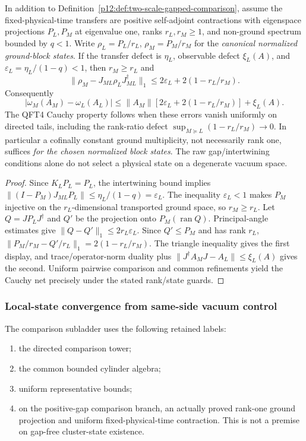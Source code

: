 \documentclass[12pt,a4paper]{article}
\begin{document}
\begin{theorem}
\label{p12:thm:two-scale-comparison-qft4}
In addition to Definition~\ref{p12:def:two-scale-gapped-comparison},
assume the fixed-physical-time transfers are positive self-adjoint
contractions with eigenspace projections $P_L,P_M$ at eigenvalue one,
ranks $r_L,r_M\ge1$, and non-ground spectrum bounded by $q<1$.
Write $\rho_L=P_L/r_L$, $\rho_M=P_M/r_M$ for the \emph{canonical
normalized ground-block states}. If the transfer defect is $\eta_L$,
observable defect $\xi_L(A)$, and
$\varepsilon_L=\eta_L/(1-q)<1$, then $r_M\ge r_L$ and
\[
 \boxed{\|\rho_M-J_{ML}\rho_LJ_{ML}^\dagger\|_1
 \le2\varepsilon_L+2(1-r_L/r_M)}.
\]
Consequently
\[
 |\omega_M(A_M)-\omega_L(A_L)|
 \le\|A_M\|[2\varepsilon_L+2(1-r_L/r_M)]+\xi_L(A).
\]
The QFT4 Cauchy property follows when these errors vanish uniformly
on directed tails, including the rank-ratio defect
$\sup_{M\succeq L}(1-r_L/r_M)\to0$.
In particular a cofinally constant ground multiplicity, not
necessarily rank one, suffices \emph{for the chosen normalized
block states}. The raw gap/intertwining conditions alone do not select
a physical state on a degenerate vacuum space.
\end{theorem}
\begin{proof}
Since $K_LP_L=P_L$, the intertwining bound implies
$\|(I-P_M)J_{ML}P_L\|\le\eta_L/(1-q)=\varepsilon_L$.
The inequality $\varepsilon_L<1$ makes $P_M$ injective on the
$r_L$-dimensional transported ground space, so $r_M\ge r_L$.
Let $Q=JP_LJ^\dagger$ and $Q'$ be the projection onto
$P_M(\operatorname{ran}Q)$. Principal-angle estimates give
$\|Q-Q'\|_1\le2r_L\varepsilon_L$.
Since $Q'\le P_M$ and has rank $r_L$,
$\|P_M/r_M-Q'/r_L\|_1=2(1-r_L/r_M)$.
The triangle inequality gives the first display, and
trace/operator-norm duality plus
$\|J^\dagger A_MJ-A_L\|\le\xi_L(A)$ gives the second.
Uniform pairwise comparison and common refinements yield the Cauchy
net precisely under the stated rank/state guards.
\end{proof}





\subsubsection{Local-state convergence from same-side vacuum control}
\label{p12:sec:qft4-subladder}
The comparison subladder uses the following retained labels:
\begin{enumerate}[label=\textnormal{(QFT4\alph*)},leftmargin=3.9em]
\item \label{p12:item:qft4a} the directed comparison tower;
\item \label{p12:item:qft4b} the common bounded cylinder algebra;
\item \label{p12:item:qft4c} uniform representative bounds;
\item \label{p12:item:qft4d} on the positive-gap comparison branch, an
actually proved rank-one ground projection and uniform fixed-physical-time
contraction. This is not a premise on gap-free cluster-state existence.
\end{enumerate}
\end{document}
